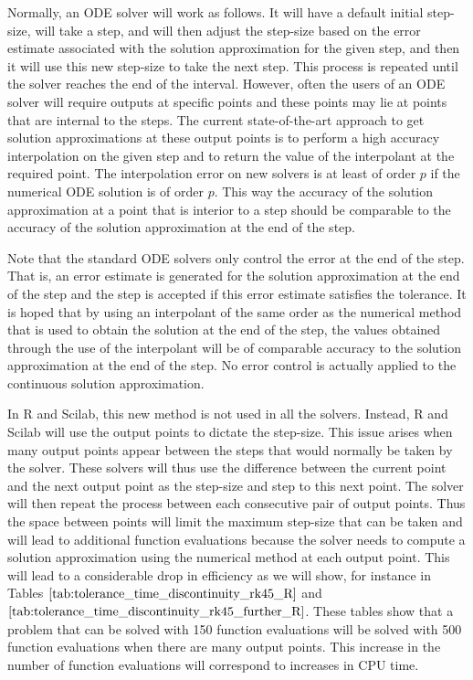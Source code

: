 Normally, an ODE solver will work as follows. It will have a default initial step-size, will take a step, and will then adjust the step-size based on the error estimate associated with the solution approximation for the given step, and then it will use this new step-size to take the next step. This process is repeated until the solver reaches the end of the interval. However, often the users of an ODE solver will require outputs at specific points and these points may lie at points that are internal to the steps. The current state-of-the-art approach to get solution approximations at these output points is to perform a high accuracy interpolation on the given step and to return the value of the interpolant at the required point. The interpolation error on new solvers is at least of order $p$ if the numerical ODE solution is of order $p$. This way the accuracy of the solution approximation at a point that is interior to a step should be comparable to the accuracy of the solution approximation at the end of the step.

Note that the standard ODE solvers only control the error at the end of the step. That is, an error estimate is generated for the solution approximation at the end of the step and the step is accepted if this error estimate satisfies the tolerance. It is hoped that by using an interpolant of the same order as the numerical method that is used to obtain the solution at the end of the step, the values obtained through the use of the interpolant will be of comparable accuracy to the solution approximation at the end of the step. No error control is actually applied to the continuous solution approximation.

In R and Scilab, this new method is not used in all the solvers. Instead, R and Scilab will use the output points to dictate the step-size. This issue arises when many output points appear between the steps that would normally be taken by the solver. These solvers will thus use the difference between the current point and the next output point as the step-size and step to this next point. The solver will then repeat the process between each consecutive pair of output points. Thus the space between points will limit the maximum step-size that can be taken and will lead to additional function evaluations because the solver needs to compute a solution approximation using the numerical method at each output point. This will lead to a considerable drop in efficiency as we will show, for instance in Tables $\ref{tab:tolerance_time_discontinuity_rk45_R}$ and $\ref{tab:tolerance_time_discontinuity_rk45_further_R}$. These tables show that a problem that can be solved with 150 function evaluations will be solved with 500 function evaluations when there are many output points. This increase in the number of function evaluations will correspond to increases in CPU time. 

